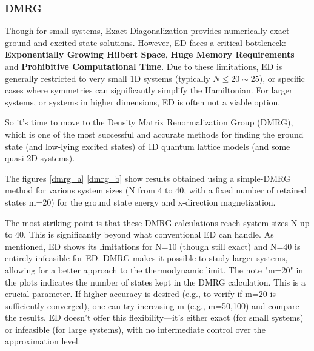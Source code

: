 \documentclass[a4paper]{article}
\begin{document}
\subsubsection{DMRG}
Though for small systems, Exact Diagonalization provides numerically exact ground and excited state solutions. However, ED faces a critical bottleneck: \textbf{Exponentially Growing Hilbert Space}, \textbf{Huge Memory Requirements} and \textbf{Prohibitive Computational Time}. Due to these limitations, ED is generally restricted to very small 1D systems (typically $N\leq20\sim25$), or specific cases where symmetries can significantly simplify the Hamiltonian. For larger systems, or systems in higher dimensions, ED is often not a viable option.

So it's time to move to the Density Matrix Renormalization Group (DMRG), which is one of the most successful and accurate methods for finding the ground state (and low-lying excited states) of 1D quantum lattice models (and some quasi-2D systems).

The figures \ref{dmrg_a} \ref{dmrg_b} show results obtained using a simple-DMRG method for various system sizes (N from 4 to 40, with a fixed number of retained states m=20) for the ground state energy and x-direction magnetization.

The most striking point is that these DMRG calculations reach system sizes N up to 40. This is significantly beyond what conventional ED can handle. As mentioned, ED shows its limitations for N=10 (though still exact) and N=40 is entirely infeasible for ED. DMRG makes it possible to study larger systems, allowing for a better approach to the thermodynamic limit. The note "m=20" in the plots indicates the number of states kept in the DMRG calculation. This is a crucial parameter. If higher accuracy is desired (e.g., to verify if m=20 is sufficiently converged), one can try increasing m (e.g., m=50,100) and compare the results. ED doesn't offer this flexibility—it's either exact (for small systems) or infeasible (for large systems), with no intermediate control over the approximation level.
\end{document}
